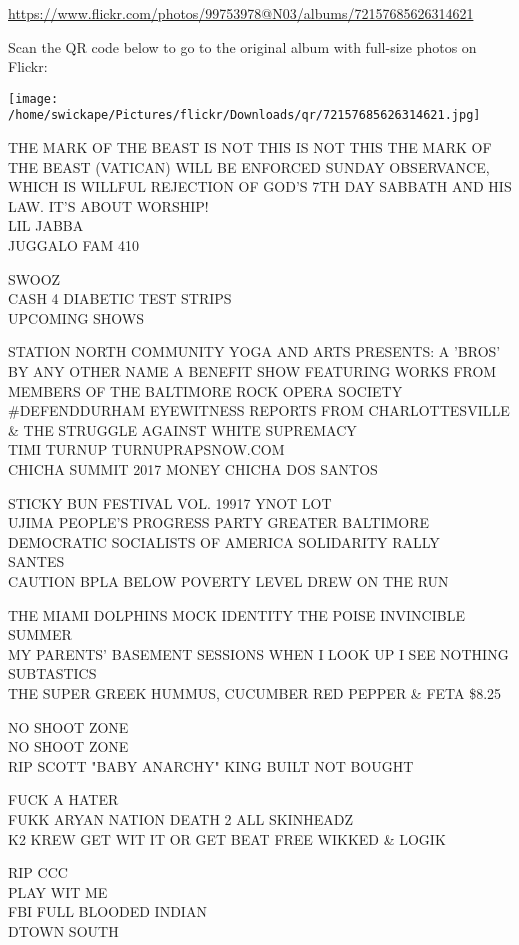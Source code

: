 \documentclass[10pt,letterpaper]{article}
\begin{document}
\url{https://www.flickr.com/photos/99753978@N03/albums/72157685626314621}

Scan the QR code below to go to the original album with full-size photos on Flickr:

\texttt{[image: /home/swickape/Pictures/flickr/Downloads/qr/72157685626314621.jpg]}
\pagebreak

THE MARK OF THE BEAST IS NOT THIS IS NOT THIS THE MARK OF THE BEAST (VATICAN) WILL BE ENFORCED SUNDAY OBSERVANCE, WHICH IS WILLFUL REJECTION OF GOD'S 7TH DAY SABBATH AND HIS LAW.  IT'S ABOUT WORSHIP!\\
LIL JABBA\\
JUGGALO FAM 410

SWOOZ\\
CASH 4 DIABETIC TEST STRIPS\\
UPCOMING SHOWS

STATION NORTH COMMUNITY YOGA AND ARTS PRESENTS: A 'BROS' BY ANY OTHER NAME A BENEFIT SHOW FEATURING WORKS FROM MEMBERS OF THE BALTIMORE ROCK OPERA SOCIETY\\
\#DEFENDDURHAM EYEWITNESS REPORTS FROM CHARLOTTESVILLE \& THE STRUGGLE AGAINST WHITE SUPREMACY\\
TIMI TURNUP TURNUPRAPSNOW.COM\\
CHICHA SUMMIT 2017 MONEY CHICHA DOS SANTOS

STICKY BUN FESTIVAL VOL. 19917 YNOT LOT\\
UJIMA PEOPLE'S PROGRESS PARTY GREATER BALTIMORE DEMOCRATIC SOCIALISTS OF AMERICA SOLIDARITY RALLY\\
SANTES\\
CAUTION BPLA BELOW POVERTY LEVEL DREW ON THE RUN

THE MIAMI DOLPHINS MOCK IDENTITY THE POISE INVINCIBLE SUMMER\\
MY PARENTS' BASEMENT SESSIONS WHEN I LOOK UP I SEE NOTHING\\
SUBTASTICS\\
THE SUPER GREEK HUMMUS, CUCUMBER RED PEPPER \& FETA \$8.25

NO SHOOT ZONE\\
NO SHOOT ZONE\\
RIP SCOTT "BABY ANARCHY" KING BUILT NOT BOUGHT

FUCK A HATER\\
FUKK ARYAN NATION DEATH 2 ALL SKINHEADZ\\
K2 KREW GET WIT IT OR GET BEAT FREE WIKKED \& LOGIK

RIP CCC\\
PLAY WIT ME\\
FBI FULL BLOODED INDIAN\\
DTOWN SOUTH
\end{document}
